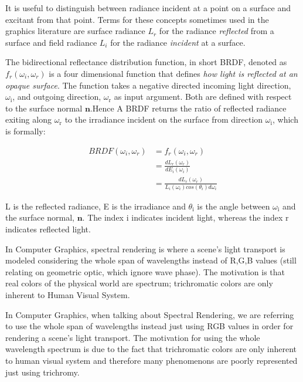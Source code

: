It is useful to distinguish between radiance incident at a point on a surface and excitant from that point. Terms for these concepts sometimes used in the graphics literature are surface radiance $L_r$ for the radiance \textit{reflected} from a surface and field radiance $L_i$ for the radiance \textit{incident} at a surface.  

\label{brdf}

The bidirectional reflectance distribution function, in short BRDF, denoted as $f_r(\omega_i, \omega_r)$ is a four dimensional function that defines \textit{how light is reflected at an opaque surface}. The function takes a negative directed incoming light direction, $\omega_{\text{i}}$, and outgoing direction, $\omega_{\text{r}}$ as input argument. Both are defined with respect to the surface normal $\mathbf{n}$.Hence A BRDF returns the ratio of reflected radiance exiting along $\omega_{\text{r}}$ to the irradiance incident on the surface from direction $\omega_{\text{i}}$, which is formally:
  
\begin{align}
  BRDF(\omega_i, \omega_r)
  & = f_r(\omega_i, \omega_r) \\
  & = \frac{dL_r(\omega_r)}{dE_i(\omega_i)} \\
  & = \frac{dL_r(\omega_r)}{L_i(\omega_i)cos(\theta_i)d\omega_i}
\end{align}

L is the reflected radiance, E is the irradiance and $\theta_{\text{i}}$ is the angle between $\omega_{\text{i}}$ and the surface normal, $\mathbf n$. The index $\text{i}$ indicates incident light, whereas the index $\text{r}$ indicates reflected light.

In Computer Graphics, spectral rendering is where a scene's light transport is modeled considering the whole span of wavelengths instead of R,G,B values (still relating on geometric optic, which ignore wave phase). The motivation is that real colors of the physical world are spectrum; trichromatic colors are only inherent to Human Visual System.

In Computer Graphics, when talking about Spectral Rendering, we are referring to use the whole span of wavelengths instead just using RGB values in order for rendering a scene's light transport. The motivation for using the whole wavelength spectrum is due to the fact that trichromatic colors are only inherent to human visual system and therefore many phenomenons are poorly represented just using trichromy. 

